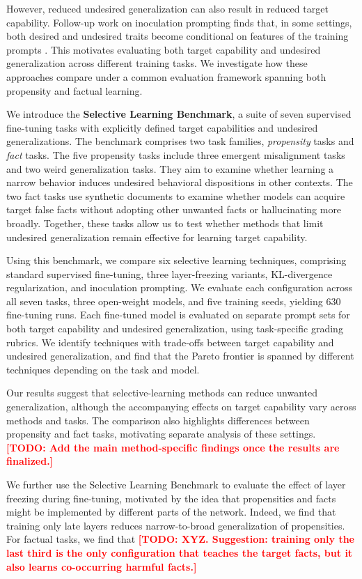 \documentclass[11pt]{article}
\newcommand{\todo}[1]{\textcolor{red}{\textbf{[TODO: #1]}}}
\begin{document}
However, reduced undesired generalization can also result in reduced target capability.
Follow-up work on inoculation prompting finds that, in some settings, both desired and undesired
traits become conditional on features of the training prompts \citep{riche2026conditionalization}.
This motivates evaluating both target capability and undesired generalization across different
training tasks. We investigate how these approaches compare under a common evaluation framework
spanning both propensity and factual learning.

We introduce the \textbf{Selective Learning Benchmark}, a suite of seven supervised fine-tuning
tasks with explicitly defined target capabilities and undesired generalizations. The benchmark
comprises two task families, \emph{propensity} tasks and \emph{fact} tasks. The five propensity
tasks include three emergent misalignment tasks and two weird generalization tasks. They aim to
examine whether learning a narrow behavior induces undesired behavioral dispositions in other
contexts. The two fact tasks use synthetic documents to examine whether models can acquire target
false facts without adopting other unwanted facts or hallucinating more broadly. Together, these
tasks allow us to test whether methods that limit undesired generalization remain effective for
learning target capability.

Using this benchmark, we compare six selective learning techniques, comprising standard
supervised fine-tuning, three layer-freezing variants, KL-divergence regularization, and
inoculation prompting. We evaluate each configuration across all seven tasks, three open-weight
models, and five training seeds, yielding 630 fine-tuning runs. Each fine-tuned model is
evaluated on separate prompt sets for both target capability and undesired generalization, using
task-specific grading rubrics. We identify techniques with trade-offs between target capability
and undesired generalization, and find that the Pareto frontier is spanned by different
techniques depending on the task and model.

Our results suggest that selective-learning methods can reduce unwanted generalization, although
the accompanying effects on target capability vary across methods and tasks. The comparison also
highlights differences between propensity and fact tasks, motivating separate analysis of these
settings. \todo{Add the main method-specific findings once the results are finalized.}

We further use the Selective Learning Benchmark to evaluate the effect of layer freezing during
fine-tuning, motivated by the idea that propensities and facts might be implemented by different
parts of the network. Indeed, we find that training only late layers reduces narrow-to-broad
generalization of propensities. For factual tasks, we find that \todo{XYZ. Suggestion: training
only the last third is the only configuration that teaches the target facts, but it also learns
co-occurring harmful facts.}
\end{document}
